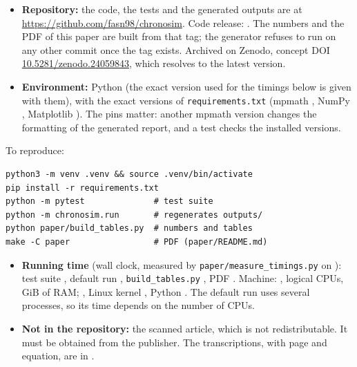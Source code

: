 \begin{itemize}
\item \textbf{Repository:} the code, the tests and the generated outputs are at \url{https://github.com/fasn98/chronosim}. Code release: \CodeRelease. The numbers and the PDF of this paper are built from that tag; the generator refuses to run on any other commit once the tag exists. Archived on Zenodo, concept DOI \href{https://doi.org/10.5281/zenodo.24059843}{10.5281/zenodo.24059843}, which resolves to the latest version.
\item \textbf{Environment:} Python \VersionPython{} (the exact version used for the timings below is given with them), with the exact versions of \texttt{requirements.txt} (mpmath \VersionMpmath, NumPy \VersionNumpy, Matplotlib \VersionMatplotlib). The pins matter: another mpmath version changes the formatting of the generated report, and a test checks the installed versions.
\end{itemize}
To reproduce:
\begin{verbatim}
python3 -m venv .venv && source .venv/bin/activate
pip install -r requirements.txt
python -m pytest              # test suite
python -m chronosim.run       # regenerates outputs/
python paper/build_tables.py  # numbers and tables
make -C paper                 # PDF (paper/README.md)
\end{verbatim}
\begin{itemize}
\item \textbf{Running time} (wall clock, measured by \texttt{paper/measure\_timings.py} on \TimeDate): test suite \TimePytest, default run \TimeRun, \texttt{build\_tables.py} \TimeTables, PDF \TimePdf. Machine: \TimeCPU, \TimeCores{} logical CPUs, \TimeRAM\,GiB of RAM; \TimeOS, Linux kernel \TimeKernel, Python \TimePython. The default run uses several processes, so its time depends on the number of CPUs.
\item \textbf{Not in the repository:} the scanned article, which is not redistributable. It must be obtained from the publisher. The transcriptions, with page and equation, are in .
\end{itemize}
